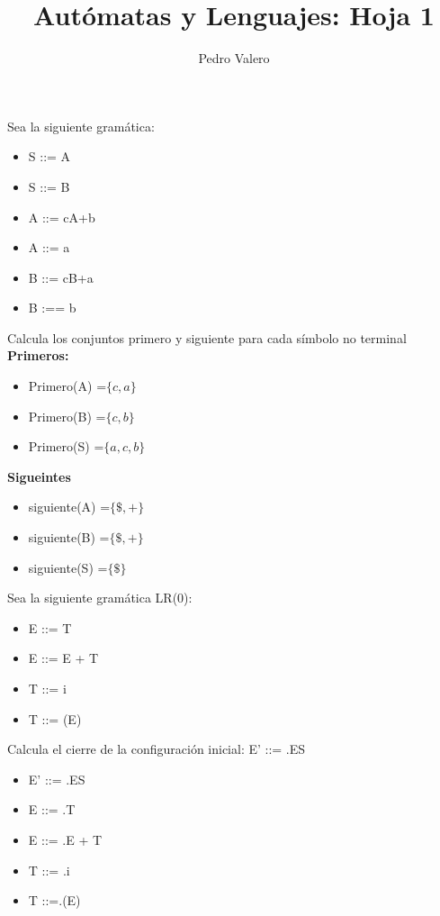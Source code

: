 \documentclass[nochap]{apuntes}
\title{Autómatas y Lenguajes: Hoja 1}
\author{Pedro Valero}
\date{}
\begin{document}
\pagestyle{plain}

\begin{problem}
Sea la siguiente gramática:
\begin{itemize}
\item S ::= A
\item S ::= B
\item A ::= cA+b
\item A ::= a
\item B ::= cB+a
\item B :== b
\end{itemize}
 Calcula los conjuntos primero y siguiente para cada símbolo no terminal
\solution
\textbf{Primeros:}

\begin{itemize}
\item Primero(A) =$\{c,a\}$
\item Primero(B) =$\{c,b\}$
\item Primero(S) =$\{a,c,b\}$
\end{itemize}

\textbf{Sigueintes}

\begin{itemize}
\item siguiente(A) =$\{\$,+\}$
\item siguiente(B) =$\{\$, +\}$
\item siguiente(S) =$\{\$\}$
\end{itemize}
\end{problem}

\begin{problem}
Sea la siguiente gramática LR(0):
\begin{itemize}
\item E ::= T
\item E ::= E + T
\item T ::= i
\item T ::= (E)
\end{itemize}
Calcula el cierre de la configuración inicial: E' ::= .ES
\solution
\begin{itemize}
\item E' ::= .ES
\item E ::= .T
\item E ::= .E + T
\item T ::= .i
\item T ::=.(E)
\end{itemize}
\end{problem}
\end{document}
